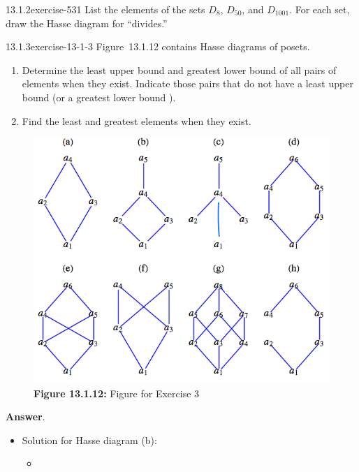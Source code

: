 \documentclass[twoside,10pt,]{book}
\numberwithin{equation}{section}
\begin{document}
\begin{divisionsolution}{13.1.2}{}{exercise-531}%
\hypertarget{p-4804}{}%
List the elements of the sets \(D_8\), \(D_{50}\), and \(D_{1001}\). For each set, draw the Hasse diagram for ``divides.''%
\end{divisionsolution}%
\begin{divisionsolution}{13.1.3}{}{exercise-13-1-3}%
\hypertarget{p-4805}{}%
Figure~13.1.12 contains Hasse diagrams of posets.\leavevmode%
\begin{enumerate}[label=(\alph*)]
\item\hypertarget{li-2194}{}\hypertarget{p-4806}{}%
Determine the least upper bound  and greatest lower bound  of all pairs of elements when they exist. Indicate those pairs that do not have a least upper bound  (or a greatest lower bound ).%
\item\hypertarget{li-2195}{}\hypertarget{p-4807}{}%
Find the least and greatest elements when they exist.%
\end{enumerate}
%
\begin{figure}
\centering
\includegraphics[width=0.8\linewidth]{images/fig-exercise-13-1-3.png}
\caption*{\textbf{Figure 13.1.12:} Figure for Exercise 3}
\end{figure}
\par\smallskip%
\noindent\textbf{Answer}.\quad%
\hypertarget{p-4808}{}%
\leavevmode%
\begin{itemize}[label=\textbullet]
\item{}\hypertarget{p-4809}{}%
Solution for Hasse diagram (b):%
\begin{itemize}[label=$\circ$]
\item{}\hypertarget{p-4810}{}%
%
\begin{equation*}

\end{equation*}
\end{itemize}
\end{itemize}
\end{divisionsolution}
\end{document}
